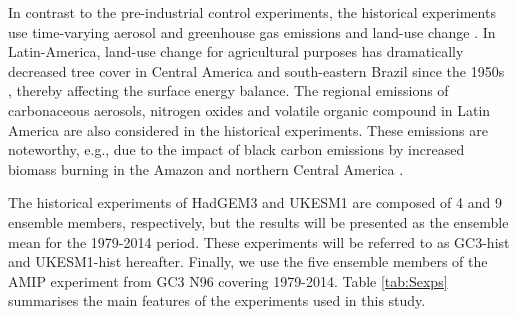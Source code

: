 In contrast to the pre-industrial control experiments, the historical experiments use  time-varying aerosol and greenhouse gas emissions and land-use change \citep{eyring2016}. In Latin-America, land-use change for agricultural purposes has dramatically decreased tree cover in Central America and south-eastern Brazil since the 1950s \citep{lawrence2012}, thereby affecting the surface energy balance. %
The regional emissions of carbonaceous aerosols, nitrogen oxides and volatile organic compound in Latin America are also considered in the historical experiments. These emissions are noteworthy, e.g., due to the impact of black carbon emissions by increased biomass burning in the Amazon and northern Central America \citep{chuvieco2008}.  

The historical experiments of HadGEM3 and UKESM1 are composed of 4 and 9 ensemble members, respectively, but the results will be presented as the ensemble mean for the 1979-2014 period. %
These experiments will be referred to as GC3-hist and UKESM1-hist hereafter.
Finally, we use the five ensemble members of the AMIP experiment from GC3 N96 covering 1979-2014. Table \ref{tab:Sexps} summarises the main features of the experiments used in this study. 